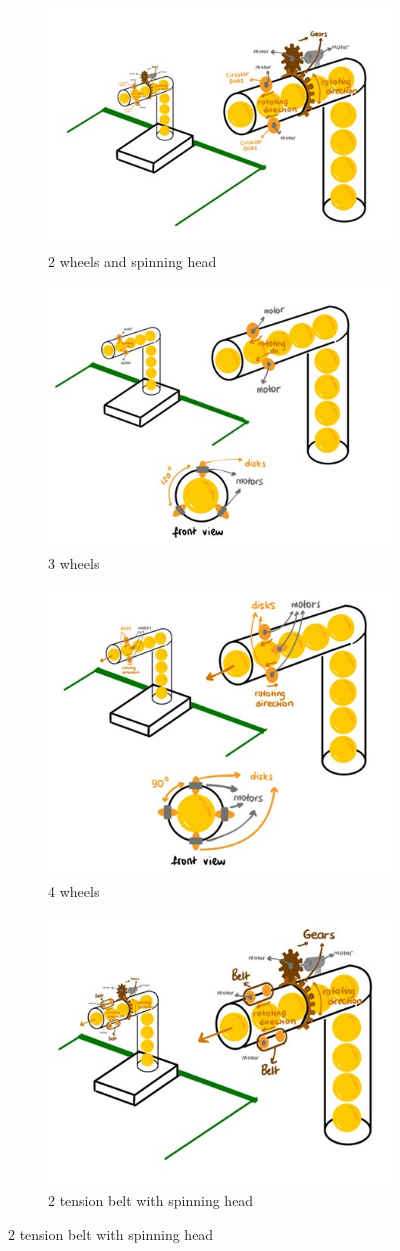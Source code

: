 \documentclass[12pt]{article}
\begin{document}
\begin{figure}[H]
\centering
\begin{subfigure}{.5\textwidth}
  \centering
  \includegraphics[width=.4\linewidth]{2 wheels and spinning head.jpg}
  \caption{2 wheels and spinning head}
  \label{fig:2wheel}
\end{subfigure}%
\begin{subfigure}{.5\textwidth}
  \centering
  \includegraphics[width=.4\linewidth]{3 wheels.jpg}
  \caption{3 wheels}
  \label{fig:3wheel}
\end{subfigure}
\begin{subfigure}{.5\textwidth}
  \centering
  \includegraphics[width=.4\linewidth]{4 wheels.jpg}
  \caption{4 wheels}
  \label{fig:4wheel}
\end{subfigure}%
\begin{subfigure}{.5\textwidth}
  \centering
  \includegraphics[width=.4\linewidth]{2 tension belt with spinning head.jpg}
  \caption{2 tension belt with spinning head}
  \label{fig:2tension}
\end{subfigure}%


\end{figure}
\end{document}
